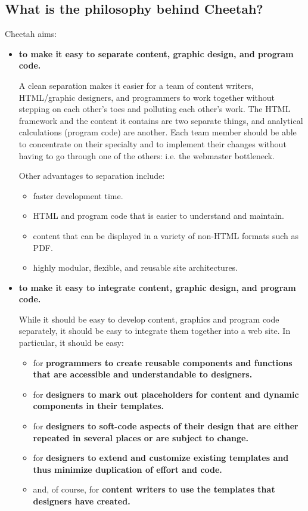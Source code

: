 \subsection{What is the philosophy behind Cheetah?}
\label{intro.aims}
Cheetah aims:
\begin{itemize}
\item {\bf to make it easy to separate content, graphic design, and program code.}
     
     A clean separation makes it easier for a team of content writers,
     HTML/graphic designers, and programmers to work together without stepping
     on each other's toes and polluting each other's work.  The HTML framework
     and the content it contains are two separate things, and analytical
     calculations (program code) are another.  Each team member should be able
     to concentrate on their specialty and to implement their changes without
     having to go through one of the others: i.e. the webmaster bottleneck.

     Other advantages to separation include:
     \begin{itemize}
     \item faster development time.
     \item HTML and program code that is easier to understand and maintain.
     \item content that can be displayed in a variety of non-HTML formats such
          as PDF.
     \item highly modular, flexible, and reusable site architectures.       
     \end{itemize}
     
\item {\bf to make it easy to integrate content, graphic design, and program code.}
     
     While it should be easy to develop content, graphics and program
     code separately, it should be easy to integrate them together into a 
     web site.  In particular, it should be easy:

     \begin{itemize}
     \item for \bf{programmers} to create reusable components and functions
          that are accessible and understandable to designers.
     \item for \bf{designers} to mark out placeholders for content and 
          dynamic components in their templates.
     \item for \bf{designers} to soft-code aspects of their design that are
          either repeated in several places or are subject to change.
     \item for \bf{designers} to extend and customize existing templates and
          thus minimize duplication of effort and code.
     \item and, of course, for \bf{content writers} to use the templates that
          designers have created.
     \end{itemize}


\end{itemize}
